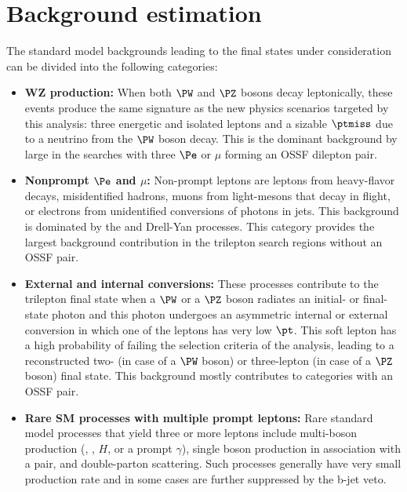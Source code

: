 	
\clearpage



\section{Background estimation}\label{sec:bgk}
The standard model backgrounds leading to the final states under consideration can be divided into the following categories:
\begin{itemize}
\item {\bf WZ production:} When both $\PW$ and $\PZ$ bosons decay leptonically, these events produce the same signature as the new physics scenarios targeted by this analysis: three energetic and isolated leptons and a sizable $\ptmiss$ due to a neutrino from the $\PW$ boson decay. This is the dominant background by large in the searches with three $\Pe$ or $\mu$ forming an OSSF dilepton pair.

\item {\bf Nonprompt $\Pe$ and $\mu$:} Non-prompt leptons are leptons from heavy-flavor decays, misidentified hadrons, muons from light-mesons that decay in flight, or electrons from unidentified conversions of  photons in jets. This background is dominated by the \ttbar and Drell-Yan processes. This category provides the largest background contribution in the trilepton search regions without an OSSF pair. 

\item {\bf External and internal conversions:} These processes contribute to the trilepton final state when a $\PW$ or a $\PZ$ boson radiates an initial- or final-state photon and this photon undergoes an asymmetric internal or external conversion in which one of the leptons has very low $\pt$. This soft lepton has a high probability of failing the selection criteria of the analysis, leading to a reconstructed two- (in case of a $\PW$ boson) or three-lepton (in case of a $\PZ$ boson) final state. This background mostly contributes to categories with an OSSF pair.

\item {\bf Rare SM processes with multiple prompt leptons:} Rare standard model processes that yield three or more leptons include multi-boson production (\PW, \PZ, $H$, or a prompt $\gamma$), single boson production in association with a \ttbar pair, and double-parton scattering. Such processes generally have very small production rate and in some cases are 
further suppressed by the b-jet veto. 
\end{itemize}

